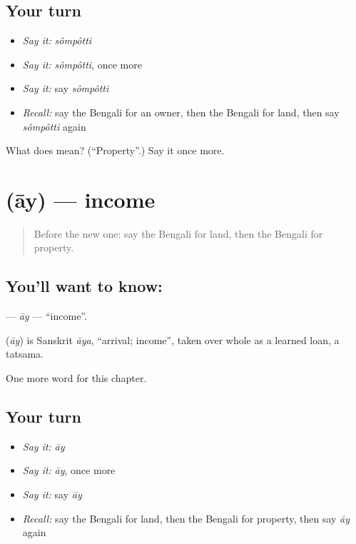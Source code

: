 \subsection*{Your turn}
\begin{itemize}
\raggedright
  \item \emph{Say it:} \emph{sômpôtti}
  \item \emph{Say it:} \emph{sômpôtti}, once more
  \item \emph{Say it:} say \emph{sômpôtti}
  \item \emph{Recall:} say the Bengali for an owner, then the Bengali for land, then say \emph{sômpôtti} again
\end{itemize}

\begin{tcolorbox}[breakable,colback=teal!4,colframe=teal!35!black,title={Before you move on}]
What does  mean? (\textquotedblleft{}Property\textquotedblright{}.) Say it once more.
\end{tcolorbox}
\section[\texorpdfstring{\bn{আয়} (āy)}{আয় (āy)}]{ (āy) — income}

\label{lesson:BN-C99-ay}



\begin{quote}
Before the new one: say the Bengali for land, then the Bengali for property.
\end{quote}

\subsection*{You'll want to know: }
\textbf{} — \emph{āy} — \textquotedblleft{}income\textquotedblright{}.

\begin{cousinweb}
\textbf{} (\emph{āy}) is Sanskrit \emph{āya}, \textquotedblleft{}arrival; income\textquotedblright{}, taken over whole as a learned loan, a tatsama.
\end{cousinweb}

\begin{grammarlens}[title={What you've built}]
One more word for this chapter.
\end{grammarlens}

\subsection*{Your turn}
\begin{itemize}
\raggedright
  \item \emph{Say it:} \emph{āy}
  \item \emph{Say it:} \emph{āy}, once more
  \item \emph{Say it:} say \emph{āy}
  \item \emph{Recall:} say the Bengali for land, then the Bengali for property, then say \emph{āy} again
\end{itemize}

